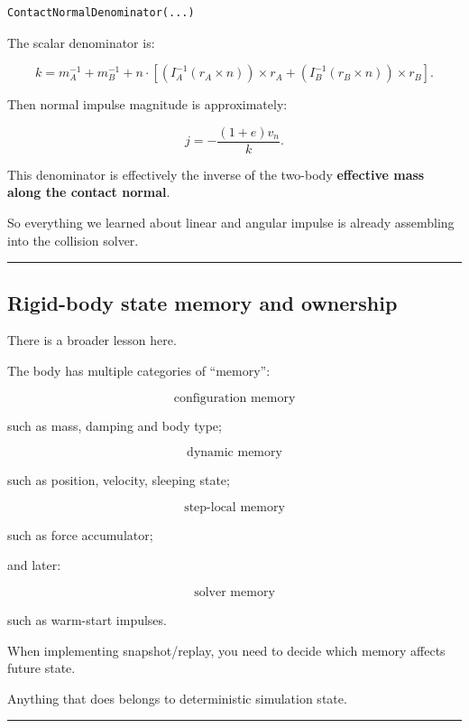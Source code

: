 \begin{verbatim}
ContactNormalDenominator(...)
\end{verbatim}

The scalar denominator is:

\[
k
=
m_A^{-1}
+
m_B^{-1}
+
n\cdot
\left[
(I_A^{-1}(r_A\times n))\times r_A
+
(I_B^{-1}(r_B\times n))\times r_B
\right].
\]

Then normal impulse magnitude is approximately:

\[
\boxed{
j
=
-\frac{
(1+e)v_n
}{
k
}.
}
\]

This denominator is effectively the inverse of the two-body \textbf{effective mass along the contact normal}.

So everything we learned about linear and angular impulse is already assembling into the collision solver.

\begin{center}\rule{0.5\linewidth}{0.5pt}\end{center}

\subsection{Rigid-body state memory and ownership}\label{06-engine-ii-ch037-rigid-body-state-memory-and-ownership}

\hypertarget{06-engine-ii-ch037-rigid-body-state-memory-and-ownership}{}

There is a broader lesson here.

The body has multiple categories of ``memory'':

\[
\boxed{
\text{configuration memory}
}
\]

such as mass, damping and body type;

\[
\boxed{
\text{dynamic memory}
}
\]

such as position, velocity, sleeping state;

\[
\boxed{
\text{step-local memory}
}
\]

such as force accumulator;

and later:

\[
\boxed{
\text{solver memory}
}
\]

such as warm-start impulses.

When implementing snapshot/replay, you need to decide which memory affects future state.

Anything that does belongs to deterministic simulation state.

\begin{center}\rule{0.5\linewidth}{0.5pt}\end{center}

